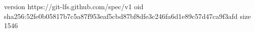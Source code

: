 version https://git-lfs.github.com/spec/v1
oid sha256:52fe0b05817b7c5a87f953eaf5cbd87bf8dfe3c246fa6d1e89c57d47ca9f3afd
size 1546
